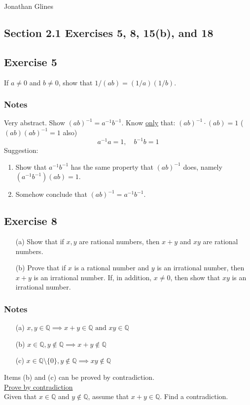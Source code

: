 \documentclass[12pt]{article}
\begin{document}
\begin{flushright}
\Large{Jonathan Glines}
\end{flushright}
\begin{flushleft}
\section*{Section 2.1 Exercises 5, 8, 15(b), and 18}
\subsection*{Exercise 5}
If $a \ne 0$ and $b \ne 0$, show that $1/\left(ab\right) = \left(1/a\right)\left(1/b\right)$.

\subsubsection*{Notes}
Very abstract. Show $\left(ab\right)^{-1} = a^{-1}b^{-1}$. Know \underline{only} that: $\left(ab\right)^{-1}\cdot\left(ab\right) = 1$ ($(ab)(ab)^{-1} = 1$ also)
\[
a^{-1} a = 1,\quad
b^{-1} b = 1
\]
Suggestion:
\begin{enumerate}
\item Show that $a^{-1}b^{-1}$ has the same property that $(ab)^{-1}$ does, namely $(a^{-1}b^{-1})(ab) = 1$.
\item Somehow conclude that $(ab)^{-1} = a^{-1}b^{-1}$.
\end{enumerate}

\subsection*{Exercise 8}
\begin{itemize}
\item[(a)] Show that if $x, y$ are rational numbers, then $x + y$ and $xy$ are rational numbers.
\item[(b)] Prove that if $x$ is a rational number and $y$ is an irrational number, then $x + y$ is an irrational number. If, in addition, $x \neq 0$, then show that $xy$ is an irrational number.
\end{itemize}

\subsubsection*{Notes}
\begin{itemize}
\item[(a)] $x, y \in \mathbb{Q} \implies x + y \in \mathbb{Q} \text{ and } xy \in \mathbb{Q}$
\item[(b)] $x \in \mathbb{Q}, y \notin \mathbb{Q} \implies x + y \notin \mathbb{Q}$
\item[(c)] $x \in \mathbb{Q} \setminus \{0\}, y \notin \mathbb{Q} \implies xy \notin \mathbb{Q}$
\end{itemize}
Items (b) and (c) can be proved by contradiction.\\
\underline{Prove by contradiction}\\
Given that $x \in \mathbb{Q}$ and $y \notin \mathbb{Q}$, assume that $x + y \in \mathbb{Q}$. Find a contradiction.


\end{flushleft}
\end{document}
